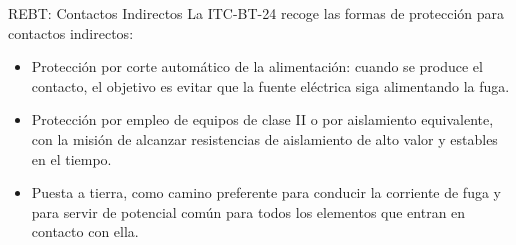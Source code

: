 \documentclass[xcolor={usenames,svgnames,dvipsnames}]{beamer}
\begin{document}
\begin{frame}[label={sec:org8228506}]{REBT: Contactos Indirectos}
La ITC-BT-24 recoge las formas de protección para contactos
indirectos:

\begin{itemize}
\item Protección por \alert{corte automático de la alimentación}: cuando se
produce el contacto, el objetivo es evitar que la fuente eléctrica
siga alimentando la fuga.

\item Protección por empleo de \alert{equipos de clase II o por aislamiento
equivalente}, con la misión de alcanzar resistencias de aislamiento
de alto valor y estables en el tiempo.

\item \alert{Puesta a tierra}, como camino preferente para conducir la corriente
de fuga y para servir de potencial común para todos los elementos que
entran en contacto con ella.
\end{itemize}
\end{frame}
\end{document}
